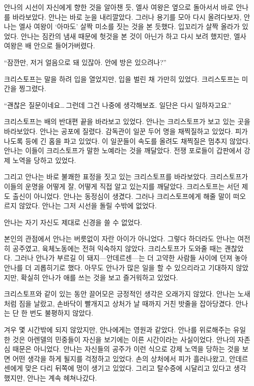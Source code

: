 안나의 시선이 자신에게 향한 것을 알아챈 듯, 엘사 여왕은 옆으로 돌아서서 바로 안나를 바라보았다. 안나는 바로 눈을 내리깔았다. 그러나 용기를 모아 다시 올려다보자, 안나는 엘사 여왕이 `아마도' 살짝 미소를 짓는 것을 본 듯했다. 입꼬리가 살짝 올라가 있었다. 안나는 짐칸의 냄새 때문에 헛것을 본 것이 아닌가 하고 다시 보려 했지만, 엘사 여왕은 배 안으로 들어가버렸다.

``잠깐만, 저거 얼음으로 돼 있잖아. 안에 방은 있으려나?''

크리스토프는 말을 하려 입을 열었지만, 입을 벌린 채 가만히 있었다. 크리스토프는 미간을 찡그렸다.

``괜찮은 질문이네요\ldots\,그런데 그건 나중에 생각해보죠. 일단은 다시 일하자고요.''

크리스토프는 배의 반대편 끝을 바라보고 있었다. 안나는 크리스토프가 보고 있는 곳을 바라보았다. 안나는 공포에 질렸다. 감독관이 일꾼 두어 명을 채찍질하고 있었다. 피가 나도록 등에 긴 홈을 파고 있었다. 이 일꾼들이 속도를 올려도 채찍질은 멈추지 않았다. 안나는 이들이 크리스토프가 말한 노예라는 것을 깨달았다. 전쟁 포로들이 갑판에서 강제 노역을 당하고 있었다.

그리고 안나는 바로 불쾌한 표정을 짓고 있는 크리스토프를 바라보았다. 크리스토프가 이들의 운명을 어떻게 잘, 어떻게 직접 알고 있는지를 깨달았다. 크리스토프는 서던 제도 출신이 아니었다. 안나는 동정심이 생겼다. 그러나 크리스토프에게 해줄 말이 떠오르지 않았다. 안나는 그저 시선을 돌릴 수밖에 없었다.

안나는 자기 자신도 제대로 신경을 쓸 수 없었다.

\textbreak

본인의 관점에서 안나는 버릇없이 자란 아이가 아니었다. 그렇다 하더라도 안나는 여전히 공주였고, 육체노동에는 전혀 익숙하지 않았다. 크리스토프가 도와줄 때는 괜찮았다. 그러나 안나가 부르길 이 돼지—안데르센—는 더 고약한 사람들 사이에 던져 놓아 안나를 더 괴롭히기로 했다. 아무도 안나가 많은 일을 할 수 있으리라고 기대하지 않았지만, 확실히 안나가 애를 쓰는 것을 보고 즐거워하고 있었다.

크리스토프와 같이 있는 동안 끌어모은 긍정적인 생각은 오래가지 않았다. 안나는 노새처럼 짐을 날랐고, 손바닥이 빨개지고 상처가 날 때까지 거친 밧줄을 잡아당겼다. 안나는 단 한 번도 불평하지 않았다.

겨우 몇 시간밖에 되지 않았지만, 안나에게는 영원과 같았다. 안나를 위로해주는 유일한 것은 아렌델의 민중들이 자신을 보기에는 이른 시간이라는 사실이었다. 안나의 자존심 때문은 아니었다. 안나는 자신들의 공주가 이런 식으로 강제 노역을 당하는 것을 보면 어떤 생각을 하게 될지를 걱정하고 있었다. 손의 상처에서 피가 흘러나왔고, 안데르센에게 맞은 다리 뒤쪽에 멍이 생기고 있었다. 그리고 탈수증에 시달리고 있다고 생각했지만, 안나는 계속 헤쳐나갔다.

